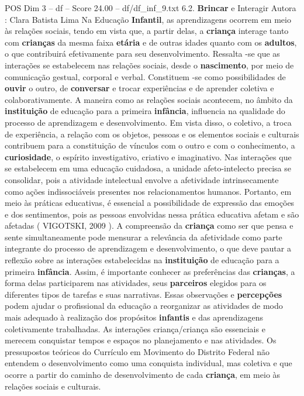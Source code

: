 \begin{textsample}{POS Dim 3 – df – Score 24.00 – df/df\_inf\_9.txt}  \label{ex:f3_pos_121}
6.2. \textbf{Brincar} e Interagir Autora : Clara Batista Lima Na Educação \textbf{Infantil}, as aprendizagens ocorrem em meio às relações sociais, tendo em vista que, a partir delas, a \textbf{criança} interage tanto com \textbf{crianças} da mesma faixa \textbf{etária} e de outras idades quanto com os \textbf{adultos}, o que contribuirá efetivamente para seu desenvolvimento.
Ressalta -se que as interações se estabelecem nas relações sociais, desde o \textbf{nascimento}, por meio de comunicação gestual, corporal e verbal.
Constituem -se como possibilidades de \textbf{ouvir} o outro, de \textbf{conversar} e trocar experiências e de aprender coletiva e colaborativamente.
A maneira como as relações sociais acontecem, no âmbito da \textbf{instituição} de educação para a primeira \textbf{infância}, influencia na qualidade do processo de aprendizagem e desenvolvimento.
Em vista disso, o coletivo, a troca de experiência, a relação com os objetos, pessoas e os elementos sociais e culturais contribuem para a constituição de vínculos com o outro e com o conhecimento, a \textbf{curiosidade}, o espírito investigativo, criativo e imaginativo.
Nas interações que se estabelecem em uma educação cuidadosa, a unidade afeto-intelecto precisa se consolidar, pois a atividade intelectual envolve a afetividade intrinsecamente como ações indissociáveis presentes nos relacionamentos humanos.
Portanto, em meio às práticas educativas, é essencial a possibilidade de expressão das emoções e dos sentimentos, pois as pessoas envolvidas nessa prática educativa afetam e são afetadas ( VIGOTSKI, 2009 ).
A compreensão da \textbf{criança} como ser que pensa e sente simultaneamente pode mensurar a relevância da afetividade como parte integrante do processo de aprendizagem e desenvolvimento, o que deve pautar a reflexão sobre as interações estabelecidas na \textbf{instituição} de educação para a primeira \textbf{infância}.
Assim, é importante conhecer as preferências das \textbf{crianças}, a forma delas participarem nas atividades, seus \textbf{parceiros} elegidos para os diferentes tipos de tarefas e suas narrativas.
Essas observações e \textbf{percepções} podem ajudar o profissional da educação a reorganizar as atividades de modo mais adequado à realização dos propósitos \textbf{infantis} e das aprendizagens coletivamente trabalhadas.
As interações criança/criança são essenciais e merecem conquistar tempos e espaços no planejamento e nas atividades.
Os pressupostos teóricos do Currículo em Movimento do Distrito Federal não entendem o desenvolvimento como uma conquista individual, mas coletiva e que ocorre a partir do caminho de desenvolvimento de cada \textbf{criança}, em meio às relações sociais e culturais.

\end{textsample}
